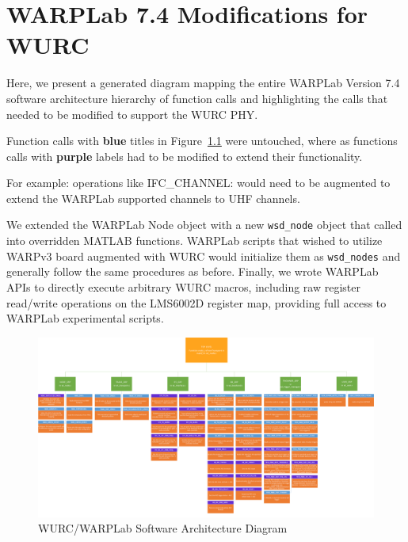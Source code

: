 \chapter{WARPLab 7.4 Modifications for WURC}
\label{sec_warplab_arch}

Here, we present a generated diagram mapping the entire WARPLab Version 7.4 \cite{warplab} software architecture hierarchy of function calls and highlighting the calls that needed to be modified to support the WURC \ac{PHY}.

Function calls with \textbf{blue} titles in Figure~\ref{fig_warplab_arch} were untouched, where as functions calls with \textbf{purple} labels had to be modified to extend their functionality.

For example: operations like {IFC\_CHANNEL}: would need to be augmented to extend the WARPLab supported channels to UHF channels.

We extended the WARPLab Node object with a new \texttt{wsd\_node} object that called into overridden MATLAB functions.
WARPLab scripts that wished to utilize WARPv3 board augmented with WURC would initialize them as \texttt{wsd\_nodes} and generally follow the same procedures as before.
Finally, we wrote WARPLab \acp{API} to directly execute arbitrary \ac{WURC} macros, including raw register read/write operations on the LMS6002D register map, providing full access to WARPLab experimental scripts.

\begin{figure}[p]
\centering
  \includegraphics[width=1.4\linewidth, angle=270,origin=c]{figs/wurc/wurc_warplab_final_tree_v7p4}   
    \caption{WURC/WARPLab Software Architecture Diagram}
\label{fig_warplab_arch}
\end{figure}



%
%
%
